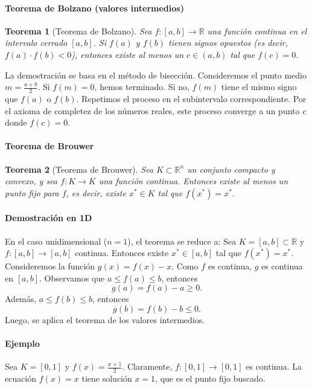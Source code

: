 \documentclass[12pt, a4paper]{article}
\theoremstyle{rioplatense}
\newtheorem{teorema}{Teorema}[section]
\begin{document}
\paragraph{Teorema de Bolzano (valores intermedios)}
\begin{teorema}[Teorema de Bolzano]
    Sea $f: [a, b] \to \mathbb{R}$ una función continua en el intervalo cerrado $[a, b]$. Si $f(a)$ y $f(b)$ tienen signos opuestos (es decir, $f(a) \cdot f(b) < 0$), entonces existe al menos un $c \in (a, b)$ tal que $f(c) = 0$.
\end{teorema}
    La demostración se basa en el método de bisección. Consideremos el punto medio $m = \frac{a + b}{2}$. Si $f(m) = 0$, hemos terminado. Si no, $f(m)$ tiene el mismo signo que $f(a)$ o $f(b)$. Repetimos el proceso en el subintervalo correspondiente. Por el axioma de completez de los números reales, este proceso converge a un punto $c$ donde $f(c) = 0$.

\paragraph{Teorema de Brouwer} %
\begin{teorema}[Teorema de Brouwer]
Sea $K \subset \mathbb{R}^n$ un conjunto compacto y convexo, y sea $f: K \to K$ una función continua. Entonces existe al menos un punto fijo para $f$, es decir, existe $x^* \in K$ tal que $f(x^*) = x^*$.
\end{teorema}

\paragraph{Demostración en 1D}
En el caso unidimensional ($n=1$), el teorema se reduce a: Sea $K = [a, b] \subset \mathbb{R}$ y $f: [a, b] \to [a, b]$ continua. Entonces existe $x^* \in [a, b]$ tal que $f(x^*) = x^*$.
Consideremos la función $g(x) = f(x) - x$. Como $f$ es continua, $g$ es continua en $[a, b]$.
Observamos que 
$a\leq f(a) \leq b$, entonces
\[
g(a) = f(a) - a \geq 0.
\]
Adem\'as,
$a\leq f(b) \leq b$, entonces
\[
g(b) = f(b) - b \leq 0.
\]
Luego, se aplica el teorema de los valores intermedios.

\paragraph{Ejemplo}
Sea $K = [0, 1]$ y $f(x) = \frac{x + 1}{2}$. Claramente, $f: [0, 1] \to [0, 1]$ es continua. La ecuación $f(x) = x$ tiene solución $x = 1$, que es el punto fijo buscado.
\end{document}
